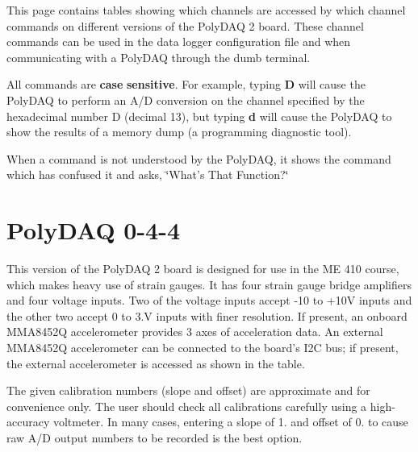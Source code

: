 This page contains tables showing which channels are accessed by which channel commands on different versions of the Poly\-D\-A\-Q 2 board. These channel commands can be used in the data logger configuration file and when communicating with a Poly\-D\-A\-Q through the dumb terminal.

All commands are {\bfseries case} {\bfseries sensitive}. For example, typing {\bfseries D} will cause the Poly\-D\-A\-Q to perform an A/\-D conversion on the channel specified by the hexadecimal number D (decimal 13), but typing {\bfseries d} will cause the Poly\-D\-A\-Q to show the results of a memory dump (a programming diagnostic tool).

When a command is not understood by the Poly\-D\-A\-Q, it shows the command which has confused it and asks, \char`\"{}\-What's That Function?\char`\"{}\hypertarget{pd_channels_pd_044}{}\section{Poly\-D\-A\-Q 0-\/4-\/4}\label{pd_channels_pd_044}
This version of the Poly\-D\-A\-Q 2 board is designed for use in the M\-E 410 course, which makes heavy use of strain gauges. It has four strain gauge bridge amplifiers and four voltage inputs. Two of the voltage inputs accept -\/10 to +10\-V inputs and the other two accept 0 to 3.\-V inputs with finer resolution. If present, an onboard M\-M\-A8452\-Q accelerometer provides 3 axes of acceleration data. An external M\-M\-A8452\-Q accelerometer can be connected to the board's I2\-C bus; if present, the external accelerometer is accessed as shown in the table.

The given calibration numbers (slope and offset) are approximate and for convenience only. The user should check all calibrations carefully using a high-\/accuracy voltmeter. In many cases, entering a slope of 1. and offset of 0. to cause raw A/\-D output numbers to be recorded is the best option.


